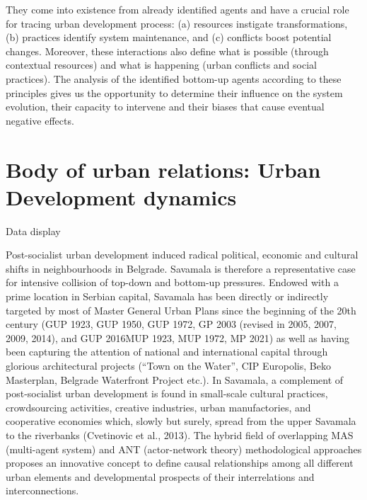 \documentclass[11pt]{report}
\begin{document}
They come into existence from already identified agents and have a crucial role for tracing urban development process: (a) resources instigate transformations, (b) practices identify system maintenance, and (c) conflicts boost potential changes. Moreover, these interactions also define what is possible (through contextual resources) and what is happening (urban conflicts and social practices). The analysis of the identified bottom-up agents according to these principles gives us the opportunity to determine their influence on the system evolution, their capacity to intervene and their biases that cause eventual negative effects.

\section{Body of urban relations: Urban Development dynamics}
Data display

Post-socialist urban development induced radical political, economic and cultural shifts in neighbourhoods in Belgrade. Savamala is therefore a representative case for intensive collision of top-down and bottom-up pressures. Endowed with a prime location in Serbian capital, Savamala has been directly or indirectly targeted by most of Master General Urban Plans since the beginning of the 20th century (GUP 1923, GUP 1950, GUP 1972, GP 2003 (revised in 2005, 2007, 2009, 2014), and GUP 2016MUP 1923, MUP 1972, MP 2021) as well as having been capturing the attention of national and international capital through glorious architectural projects (“Town on the Water”, CIP Europolis, Beko Masterplan, Belgrade Waterfront Project etc.). In Savamala, a complement of post-socialist urban development is found in small-scale cultural practices, crowdsourcing activities, creative industries, urban manufactories, and cooperative economies which, slowly but surely, spread from the upper Savamala to the riverbanks (Cvetinovic et al., 2013). The hybrid field of overlapping MAS (multi-agent system) and ANT (actor-network theory) methodological approaches proposes an innovative concept to define causal relationships among all different urban elements and developmental prospects of their interrelations and interconnections.
\end{document}
